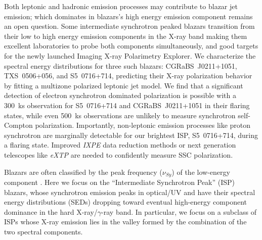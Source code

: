 Both leptonic and hadronic emission processes may contribute to blazar jet emission; which dominates in blazars's high energy emission component remains an open question. Some intermediate synchrotron peaked blazars transition from their low to high energy emission components in the X-ray band making them excellent laboratories to probe both components simultaneously, and good targets for the newly launched Imaging X-ray Polarimetry Explorer. We characterize the spectral energy distributions for three such blazars: CGRaBS~J0211+1051, TXS~0506+056, and S5~0716+714, predicting their X-ray polarization behavior by fitting a multizone polarized leptonic jet model. We find that a significant detection of electron synchrotron dominated polarization is possible with a 300~ks observation for S5~0716+714 and CGRaBS~J0211+1051 in their flaring states, while even 500~ks observations are unlikely to measure synchrotron self-Compton polarization. Importantly, non-leptonic emission processes like proton synchrotron are marginally detectable for our brightest ISP, S5~0716+714, during a flaring state. Improved {\it IXPE} data reduction methods or next generation telescopes like {\it eXTP} are needed to confidently measure SSC polarization.

Blazars are often classified by the peak frequency ($\nu_{Sy}$) of the low-energy component \citep{abdo_spectral_2010}. Here we focus on the ``Intermediate Synchrotron Peak'' (ISP) blazars, whose synchrotron emission  peaks in optical/UV and have their spectral energy distributions (SEDs) dropping toward eventual high-energy component dominance in the hard X-ray/$\gamma$-ray band. In particular, we focus on a subclass of ISPs whose X-ray emission lies in the valley formed by the combination of the two spectral components.

